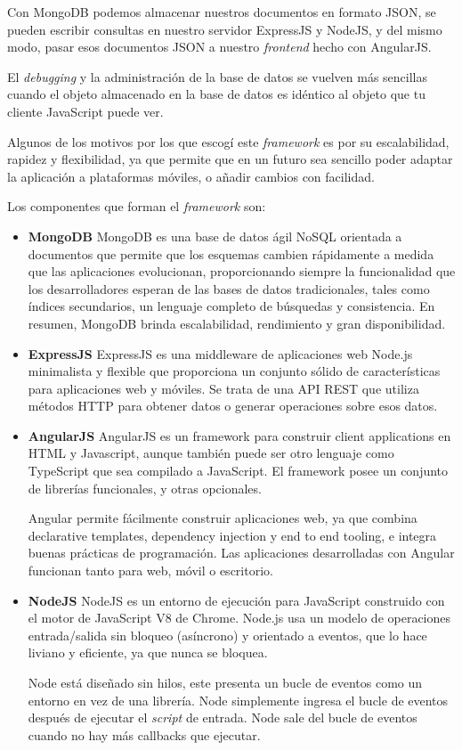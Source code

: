 Con MongoDB podemos almacenar nuestros documentos en formato JSON, se pueden escribir consultas en nuestro servidor ExpressJS y NodeJS, y del mismo modo, pasar esos documentos JSON a nuestro \textit{frontend} hecho con AngularJS.


El \textit{debugging} y la administración de la base de datos se vuelven más sencillas cuando el objeto almacenado en la base de datos es idéntico al objeto que tu cliente JavaScript puede ver\cite{mongodb_mean_stack}.


Algunos de los motivos por los que escogí este \textit{framework} es por su escalabilidad, rapidez y flexibilidad, ya que permite que en un futuro sea sencillo poder adaptar la aplicación a plataformas móviles, o añadir cambios con facilidad.


Los componentes que forman el \textit{framework} son:


\begin{itemize}
\item \textbf{MongoDB}
MongoDB es una base de datos ágil NoSQL orientada a documentos que permite que los esquemas cambien rápidamente a medida que las aplicaciones evolucionan, proporcionando siempre la funcionalidad que los desarrolladores esperan de las bases de datos tradicionales, tales como índices secundarios, un lenguaje completo de búsquedas y consistencia. En resumen, MongoDB brinda escalabilidad, rendimiento y gran disponibilidad\cite{mongodb_gest_datos}. 
\item \textbf{ExpressJS}
ExpressJS es una middleware de aplicaciones web Node.js minimalista y flexible que proporciona un conjunto sólido de características para aplicaciones web y móviles\cite{express}. Se trata de una API REST que utiliza métodos HTTP para obtener datos o generar operaciones sobre esos datos.
\item \textbf{AngularJS}
AngularJS es un framework para construir client applications en HTML y Javascript, aunque también puede ser otro lenguaje como TypeScript que sea compilado a JavaScript. El framework posee un conjunto de librerías funcionales, y otras opcionales\cite{angular_docs}.


Angular permite fácilmente construir aplicaciones web, ya que combina declarative templates, dependency injection y end to end tooling, e integra buenas prácticas de programación. Las aplicaciones desarrolladas con Angular funcionan tanto para web, móvil o escritorio\cite{angular_arch}. 
\item \textbf{NodeJS}
NodeJS es un entorno de ejecución para JavaScript construido con el motor de JavaScript V8 de Chrome. Node.js usa un modelo de operaciones entrada/salida sin bloqueo (asíncrono) y orientado a eventos, que lo hace liviano y eficiente, ya que nunca se bloquea. 


Node está diseñado sin hilos, este presenta un bucle de eventos como un entorno en vez de una librería. Node simplemente ingresa el bucle de eventos después de ejecutar el \textit{script} de entrada. Node sale del bucle de eventos cuando no hay más callbacks que ejecutar\cite{node_acerca}.
\end{itemize}


